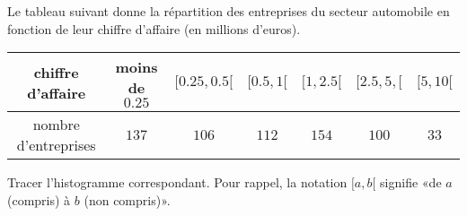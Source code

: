 
\begin{exercice}\label{exoSeconde-0033}

    Le tableau suivant donne la répartition des entreprises du secteur automobile en fonction de leur chiffre d'affaire (en millions d'euros).

    \begin{center}
    \begin{tabular}{|c||c|c|c|c|c|c|}
        \hline
        chiffre d'affaire&moins de \( 0.25\)&\( \mathopen[ 0.25 ,0.5 [\)&$\mathopen[ 0.5,1  [$&$\mathopen[ 1 , 2.5 [$&$\mathopen[ 2.5,5 ,  [$&$\mathopen[ 5 , 10 [$\\
            \hline\hline
            nombre d'entreprises&\( 137\)&\( 106\)&\( 112\)&$154$&\( 100\)&\( 33\)\\
            \hline
    \end{tabular}
    \end{center}

    Tracer l'histogramme correspondant. Pour rappel, la notation \( \mathopen[ a , b [\) signifie «de \( a\) (compris) à \( b\) (non compris)».

\end{exercice}
